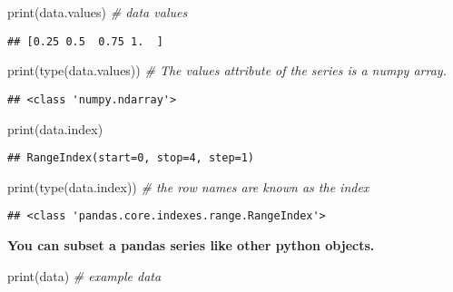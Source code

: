 \documentclass[
]{book}
\newenvironment{Shaded}{\begin{snugshade}}{\end{snugshade}}
\newcommand{\BuiltInTok}[1]{#1}
\newcommand{\CommentTok}[1]{\textcolor[rgb]{0.56,0.35,0.01}{\textit{#1}}}
\newcommand{\NormalTok}[1]{#1}
\begin{document}
\begin{Shaded}
\begin{Highlighting}[]
\BuiltInTok{print}\NormalTok{(data.values) }\CommentTok{\# data values}
\end{Highlighting}
\end{Shaded}

\begin{verbatim}
## [0.25 0.5  0.75 1.  ]
\end{verbatim}

\begin{Shaded}
\begin{Highlighting}[]
\BuiltInTok{print}\NormalTok{(}\BuiltInTok{type}\NormalTok{(data.values)) }\CommentTok{\# The values attribute of the series is a numpy array.}
\end{Highlighting}
\end{Shaded}

\begin{verbatim}
## <class 'numpy.ndarray'>
\end{verbatim}

\begin{Shaded}
\begin{Highlighting}[]
\BuiltInTok{print}\NormalTok{(data.index) }
\end{Highlighting}
\end{Shaded}

\begin{verbatim}
## RangeIndex(start=0, stop=4, step=1)
\end{verbatim}

\begin{Shaded}
\begin{Highlighting}[]
\BuiltInTok{print}\NormalTok{(}\BuiltInTok{type}\NormalTok{(data.index)) }\CommentTok{\# the row names are known as the index}
\end{Highlighting}
\end{Shaded}

\begin{verbatim}
## <class 'pandas.core.indexes.range.RangeIndex'>
\end{verbatim}

\textbf{You can subset a pandas series like other python objects.}

\begin{Shaded}
\begin{Highlighting}[]
\BuiltInTok{print}\NormalTok{(data) }\CommentTok{\# example data}
\end{Highlighting}
\end{Shaded}
\end{document}
